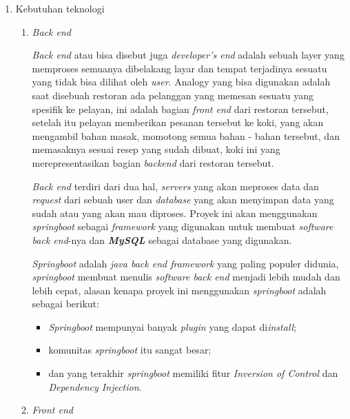 \documentclass[a4paper]{article}
\begin{document}
\begin{enumerate}[label=\alph*. ]

    \item Kebutuhan teknologi

          \begin{enumerate}
              \item \textit{Back end}

                    \textit{Back end} atau bisa disebut juga \textit{developer's end} adalah sebuah layer yang memproses semuanya dibelakang layar dan tempat terjadinya sesuatu yang tidak bisa dilihat oleh \textit{user}\autocite{letsgodojo-frontend-backend}. Analogy yang bisa digunakan adalah saat disebuah restoran ada pelanggan yang memesan sesuatu yang spesifik ke pelayan, ini adalah bagian \textit{front end} dari restoran tersebut, setelah itu pelayan memberikan pesanan tersebut ke koki, yang akan mengambil bahan masak, momotong semua bahan - bahan tersebut, dan memasaknya sesuai resep yang sudah dibuat, koki ini yang merepresentasikan bagian \textit{backend} dari restoran tersebut\autocite{codecademy-backend}.

                    \textit{Back end} terdiri dari dua hal, \textit{servers} yang akan meproses data dan \textit{request} dari sebuah user dan \textit{database} yang akan menyimpan data yang sudah atau yang akan mau diproses\autocite{codecademy-backend}. Proyek ini akan menggunakan \textit{springboot} sebagai \textit{framework} yang digunakan untuk membuat \textit{software back end}-nya dan \textit{\textbf{MySQL}} sebagai database yang digunakan.

                    \textit{Springboot} adalah \textit{java back end framework} yang paling populer didunia, \textit{springboot} membuat menulis \textit{software back end} menjadi lebih mudah dan lebih cepat\autocite{spring-framework}, alasan kenapa proyek ini menggunakan \textit{springboot} adalah sebagai berikut:
                    \begin{itemize}
                        \item \textit{Springboot} mempunyai banyak \textit{plugin} yang dapat di\textit{install};
                        \item komunitas \textit{springboot} itu sangat besar;
                        \item dan yang terakhir \textit{springboot} memiliki fitur \textit{Inversion of Control} dan \textit{Dependency Injection}.
                    \end{itemize}

              \item \textit{Front end}


\end{enumerate}
\end{enumerate}
\end{document}

